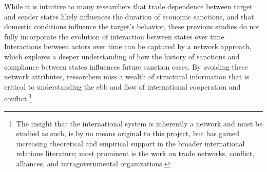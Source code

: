 While it is intuitive to many researchers that trade dependence between target and sender states likely influences the duration of economic sanctions, and that domestic conditions influence the target's behavior, these previous studies do not fully incorporate the evolution of interaction between states over time. Interactions between actors over time can be captured by a network approach, which explores a deeper understanding of how the history of sanctions and compliance between states influences future sanction cases. By avoiding these network attributes, researchers miss a wealth of structural information that is critical to understanding the ebb and flow of international cooperation and conflict.\footnote{The insight that the international system is inherently a network and must be studied as such, is by no means original to this project, but has gained increasing theoretical and empirical support in the broader international relations literature; most prominent is the work on trade networks,\cite{hoff2004modeling, ward:rainbow:2013} conflict,\cite{AnneAuthor} alliances,\cite{warren2010geometry} and intragovernmental organizations.\cite{cao2009networks,greenhill2010norm}}



